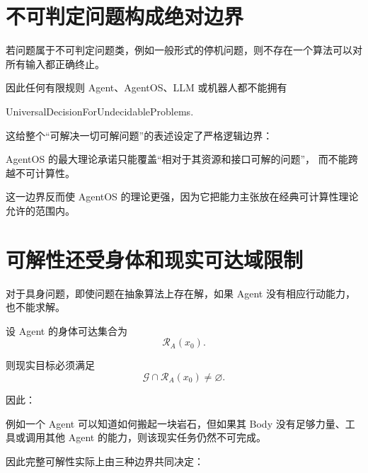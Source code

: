 \section{不可判定问题构成绝对边界}

若问题属于不可判定问题类，例如一般形式的停机问题，则不存在一个算法可以对所有输入都正确终止。

因此任何有限规则 Agent、AgentOS、LLM 或机器人都不能拥有
\begin{statementbox}
UniversalDecisionForUndecidableProblems.
\end{statementbox}

这给整个“可解决一切可解问题”的表述设定了严格逻辑边界：

\begin{statementbox}
AgentOS 的最大理论承诺只能覆盖“相对于其资源和接口可解的问题”，
而不能跨越不可计算性。
\end{statementbox}

这一边界反而使 AgentOS 的理论更强，因为它把能力主张放在经典可计算性理论允许的范围内。

\section{可解性还受身体和现实可达域限制}

对于具身问题，即使问题在抽象算法上存在解，如果 Agent 没有相应行动能力，也不能求解。

设 Agent 的身体可达集合为
\begin{equation}
\mathcal R_A(x_0).
\end{equation}

则现实目标必须满足
\begin{equation}
\mathcal G
\cap
\mathcal R_A(x_0)
\neq
\varnothing.
\end{equation}

因此：

\begin{statementbox}
\centering
{}
\end{statementbox}

例如一个 Agent 可以知道如何搬起一块岩石，但如果其 Body 没有足够力量、工具或调用其他 Agent 的能力，则该现实任务仍然不可完成。

因此完整可解性实际上由三种边界共同决定：

\begin{statementbox}
\centering
{}
\end{statementbox}

